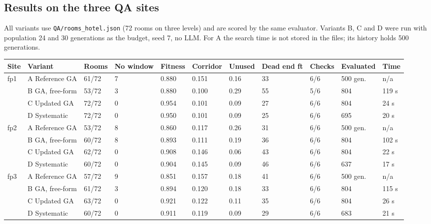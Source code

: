 \subsection{Results on the three QA sites}\label{sec:optqa}
All variants use \texttt{QA/rooms\_hotel.json} (72 rooms on three levels) and are scored by the same evaluator. Variants
B, C and D were run with population 24 and 30 generations as the budget, seed 7, no LLM.
For A the search time is not stored in the files; its history holds 500 generations.
\begingroup{}\label{tab:optcompare}\endgroup
{\footnotesize\begin{longtable}{p{0.76cm}p{2.75cm}p{1.04cm}p{1.14cm}p{1.04cm}p{1.14cm}p{1.04cm}p{1.23cm}p{0.95cm}p{1.42cm}p{0.95cm}}
\toprule
\textbf{Site} & \textbf{Variant} & \textbf{Rooms} & \textbf{No window} & \textbf{Fitness} & \textbf{Corridor} & \textbf{Unused} & \textbf{Dead end ft} & \textbf{Checks} & \textbf{Evaluated} & \textbf{Time} \\ \midrule \endhead
fp1 & A Reference GA & 61/72 & 7 & 0.880 & 0.151 & 0.16 & 33 & 6/6 & 500 gen. & n/a \\
 & B GA, free-form & 53/72 & 3 & 0.880 & 0.100 & 0.29 & 55 & 5/6 & 804 & 119 s \\
 & C Updated GA & 72/72 & 0 & 0.954 & 0.101 & 0.09 & 27 & 6/6 & 804 & 24 s \\
 & D Systematic & 72/72 & 0 & 0.950 & 0.101 & 0.09 & 25 & 6/6 & 695 & 20 s \\ \midrule
fp2 & A Reference GA & 53/72 & 8 & 0.860 & 0.117 & 0.26 & 31 & 6/6 & 500 gen. & n/a \\
 & B GA, free-form & 60/72 & 8 & 0.893 & 0.111 & 0.19 & 36 & 6/6 & 804 & 102 s \\
 & C Updated GA & 62/72 & 0 & 0.908 & 0.146 & 0.06 & 43 & 6/6 & 804 & 22 s \\
 & D Systematic & 60/72 & 0 & 0.904 & 0.145 & 0.09 & 46 & 6/6 & 637 & 17 s \\ \midrule
fp3 & A Reference GA & 57/72 & 9 & 0.851 & 0.157 & 0.18 & 41 & 6/6 & 500 gen. & n/a \\
 & B GA, free-form & 61/72 & 3 & 0.894 & 0.120 & 0.18 & 33 & 6/6 & 804 & 115 s \\
 & C Updated GA & 63/72 & 0 & 0.921 & 0.122 & 0.11 & 35 & 6/6 & 804 & 26 s \\
 & D Systematic & 60/72 & 0 & 0.911 & 0.119 & 0.09 & 29 & 6/6 & 683 & 21 s \\
\bottomrule
\end{longtable}}\addtocounter{table}{-1}
